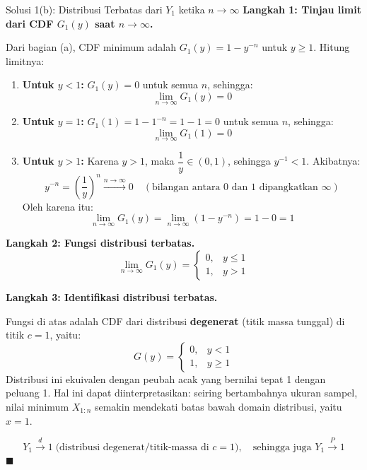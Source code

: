 \documentclass[10pt,twoside]{article}
\begin{document}
\begin{solbox}{Solusi 1(b): Distribusi Terbatas dari $Y_1$ ketika $n \to \infty$}
\textbf{Langkah 1: Tinjau limit dari CDF $G_1(y)$ saat $n \to \infty$.}

Dari bagian (a), CDF minimum adalah $G_1(y) = 1 - y^{-n}$ untuk $y \ge 1$. Hitung limitnya:
\begin{enumerate}[label=\arabic*.]
  \item \textbf{Untuk $y < 1$:} $G_1(y) = 0$ untuk semua $n$, sehingga:
  \[
  \lim_{n \to \infty} G_1(y) = 0
  \]
  \item \textbf{Untuk $y = 1$:} $G_1(1) = 1 - 1^{-n} = 1 - 1 = 0$ untuk semua $n$, sehingga:
  \[
  \lim_{n \to \infty} G_1(1) = 0
  \]
  \item \textbf{Untuk $y > 1$:} Karena $y > 1$, maka $\dfrac{1}{y} \in (0, 1)$, sehingga $y^{-1} < 1$. Akibatnya:
  \[
  y^{-n} = \left(\frac{1}{y}\right)^n \xrightarrow{n \to \infty} 0 \quad (\text{bilangan antara 0 dan 1 dipangkatkan } \infty)
  \]
  Oleh karena itu:
  \[
  \lim_{n \to \infty} G_1(y) = \lim_{n \to \infty} (1 - y^{-n}) = 1 - 0 = 1
  \]
\end{enumerate}

\textbf{Langkah 2: Fungsi distribusi terbatas.}
\[
\lim_{n \to \infty} G_1(y) = \begin{cases} 0, & y \le 1 \\ 1, & y > 1 \end{cases}
\]

\textbf{Langkah 3: Identifikasi distribusi terbatas.}

Fungsi di atas adalah CDF dari distribusi \textbf{degenerat} (titik massa tunggal) di titik $c = 1$, yaitu:
\[
G(y) = \begin{cases} 0, & y < 1 \\ 1, & y \ge 1 \end{cases}
\]
Distribusi ini ekuivalen dengan peubah acak yang bernilai tepat 1 dengan peluang 1. Hal ini dapat diinterpretasikan: seiring bertambahnya ukuran sampel, nilai minimum $X_{1:n}$ semakin mendekati batas bawah domain distribusi, yaitu $x = 1$.

\[
\boxed{Y_1 \xrightarrow{d} 1 \;\text{(distribusi degenerat/titik-massa di } c = 1)}, \quad \text{sehingga juga } Y_1 \xrightarrow{P} 1
\] \qquad $\blacksquare$
\end{solbox}
\end{document}
